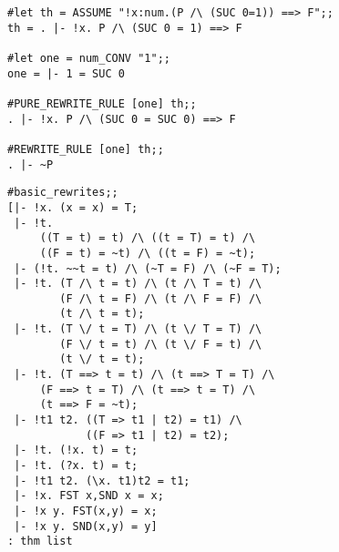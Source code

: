 \vskip4mm
\vskip4mm




\vskip5mm


\vskip7mm

\vskip4mm
\begin{session}\begin{verbatim}
#let th = ASSUME "!x:num.(P /\ (SUC 0=1)) ==> F";;
th = . |- !x. P /\ (SUC 0 = 1) ==> F

#let one = num_CONV "1";;
one = |- 1 = SUC 0

#PURE_REWRITE_RULE [one] th;;
. |- !x. P /\ (SUC 0 = SUC 0) ==> F

#REWRITE_RULE [one] th;;
. |- ~P
\end{verbatim}\end{session}



\vskip 4mm
\begin{session}\begin{verbatim}
#basic_rewrites;;
[|- !x. (x = x) = T;
 |- !t.
     ((T = t) = t) /\ ((t = T) = t) /\ 
     ((F = t) = ~t) /\ ((t = F) = ~t);
 |- (!t. ~~t = t) /\ (~T = F) /\ (~F = T);
 |- !t. (T /\ t = t) /\ (t /\ T = t) /\ 
        (F /\ t = F) /\ (t /\ F = F) /\ 
        (t /\ t = t);
 |- !t. (T \/ t = T) /\ (t \/ T = T) /\ 
        (F \/ t = t) /\ (t \/ F = t) /\ 
        (t \/ t = t);
 |- !t. (T ==> t = t) /\ (t ==> T = T) /\
     (F ==> t = T) /\ (t ==> t = T) /\
     (t ==> F = ~t);
 |- !t1 t2. ((T => t1 | t2) = t1) /\ 
            ((F => t1 | t2) = t2);
 |- !t. (!x. t) = t;
 |- !t. (?x. t) = t;
 |- !t1 t2. (\x. t1)t2 = t1;
 |- !x. FST x,SND x = x;
 |- !x y. FST(x,y) = x;
 |- !x y. SND(x,y) = y]
: thm list
\end{verbatim}\end{session}

